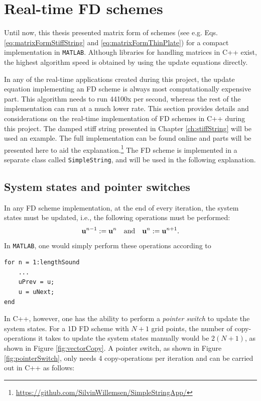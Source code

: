 \section{Real-time FD schemes}\label{sec:realTimeFDScheme}
Until now, this thesis presented matrix form of schemes (see e.g. Eqs. \eqref{eq:matrixFormStiffString} and \eqref{eq:matrixFormThinPlate}) for a compact implementation in \texttt{MATLAB}. Although libraries for handling matrices in C++ exist, the highest algorithm speed is obtained by using the update equations directly.

In any of the real-time applications created during this project, the update equation implementing an FD scheme is always most computationally expensive part. This algorithm needs to run 44100x per second, whereas the rest of the implementation can run at a much lower rate. This section provides details and considerations on the real-time implementation of FD schemes in C++ during this project. The damped stiff string presented in Chapter \ref{ch:stiffString} will be used an example. The full implementation can be found online and parts will be presented here to aid the explanation.\footnote{\url{https://github.com/SilvinWillemsen/SimpleStringApp/}} The FD scheme is implemented in a separate class called \texttt{SimpleString}, and will be used in the following explanation.


\subsection{System states and pointer switches}\label{sec:pointerSwitch}
In any FD scheme implementation, at the end of every iteration, the system states must be updated, i.e., the following operations must be performed:
\begin{equation*}
    \mathbf{u}^{n-1} := \mathbf{u}^{n} \quad \text{and} \quad \mathbf{u}^{n} := \mathbf{u}^{n+1}.
\end{equation*}
In \texttt{MATLAB}, one would simply perform these operations according to

\setlstMAT
\begin{lstlisting}[belowskip=-0.5\baselineskip]
for n = 1:lengthSound
    ...
    uPrev = u;
    u = uNext;
end
\end{lstlisting}
In C++, however, one has the ability to perform a \textit{pointer switch} to update the system states. For a 1D FD scheme with $N+1$ grid points, the number of copy-operations it takes to update the system states manually would be $2(N+1)$, as shown in Figure \ref{fig:vectorCopy}. A pointer switch, as shown in Figure \ref{fig:pointerSwitch}, only needs 4 copy-operations per iteration and can be carried out in C++ as follows:

